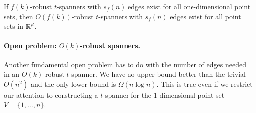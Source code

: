 \documentclass{cccg12}
\begin{document}
\begin{conj}
If $f(k)$-robust $t$-spanners with $s_f(n)$ edges exist for all one-dimensional point sets, then $O(f(k))$-robust $t$-spanners with $s_f(n)$ edges exist for all point sets in $\mathbb{R}^d$.
\end{conj}


%

\paragraph{Open problem: $O(k)$-robust spanners.}

Another fundamental open problem has to do with the number of edges needed
in an $O(k)$-robust $t$-spanner.  We have no upper-bound better than the
trivial $O(n^2)$ and the only lower-bound is $\Omega(n\log n)$.  This is
true even if we restrict our attention to constructing a $t$-spanner
for the 1-dimensional point set $V=\{1,\ldots,n\}$.

%
%
%
%



\end{document}
